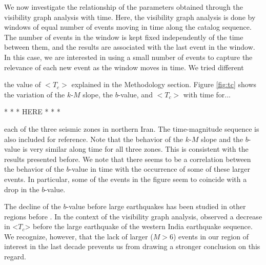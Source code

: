 We now investigate the relationship of the parameters obtained through the visibility graph analysis with time. Here, the visibility graph analysis is done by windows of equal number of events moving in time along the catalog sequence. The number of events in the window is kept fixed independently of the time between them, and the results are associated with the last event in the window. In this case, we are interested in using a small number of events to capture the relevance of each new event as the window moves in time. We tried different 

 the value of $<$$T_c$$>$ explained in the Methodology section. Figure \ref{fig:tc} shows the variation of the $k$-$M$ slope, the $b$-value, and $<$$T_c$$>$ with time for...

* * * HERE * * *

each of the three seismic zones in northern Iran. The time-magnitude sequence is also included for reference. Note that the behavior of the $k$-$M$ slope and the $b$-value is very similar along time for all three zones.  This is consistent with the results presented before. We note that there seems to be a correlation between the behavior of the $b$-value in time with the occurrence of some of these larger events. In particular, some of the events in the figure seem to coincide with a drop in the $b$-value. 

The decline of the $b$-value before large earthquakes has been studied in other regions before \citep[e.g.,][]{Wyss2000, Wyss2006, Schorlemmer2005, Chan2012}. In the context of the visibility graph analysis, \citet{Telesca2016} observed a decrease in <$T_c$> before the large earthquake of the western India earthquake sequence. We recognize, however, that the lack of larger ($M>6$) events in our region of interest in the last decade prevents us from drawing a stronger conclusion on this regard. 



